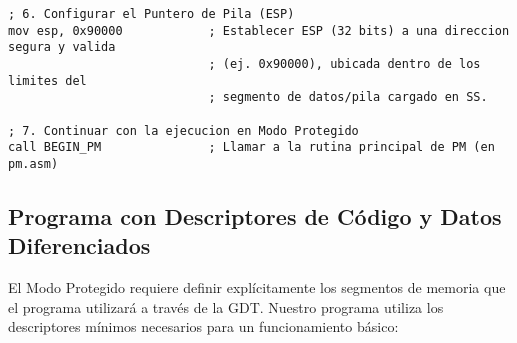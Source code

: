 \begin{lstlisting}[style=NasmStyle, breaklines=true,
    caption={\texttt{switch\_to\_pm.asm} (Nucleo de la transicion)}]
; 6. Configurar el Puntero de Pila (ESP)
mov esp, 0x90000            ; Establecer ESP (32 bits) a una direccion segura y valida
                            ; (ej. 0x90000), ubicada dentro de los limites del
                            ; segmento de datos/pila cargado en SS.

; 7. Continuar con la ejecucion en Modo Protegido
call BEGIN_PM               ; Llamar a la rutina principal de PM (en pm.asm)
\end{lstlisting}


\subsection{Programa con Descriptores de Código y Datos Diferenciados}

El Modo Protegido requiere definir explícitamente los segmentos de memoria que el programa utilizará a través de la GDT. Nuestro programa utiliza los descriptores mínimos necesarios para un funcionamiento básico:

